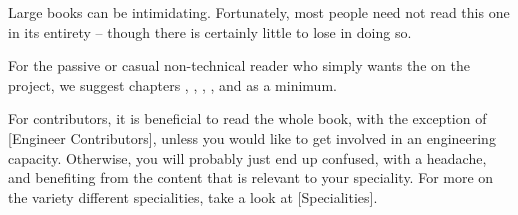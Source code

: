 

Large books can be intimidating. Fortunately, most people need not read this one in its entirety -- though there is certainly little to lose in doing so.

For the passive or casual non-technical reader who simply wants the  on the project, we suggest chapters \in[Leitmotifs], , , \in[Timeline], and  as a minimum.

For contributors, it is beneficial to read the whole book, with the exception of [Engineer Contributors], unless you would like to get involved in an engineering capacity. Otherwise, you will probably just end up confused, with a headache, and benefiting from the content that is relevant to your speciality. For more on the variety different specialities, take a look at [Specialities].

\StopChapter

